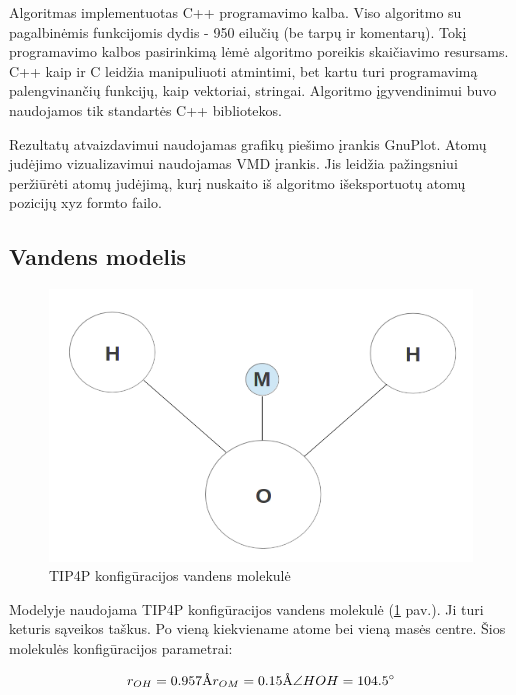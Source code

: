 Algoritmas implementuotas C++ programavimo kalba.
Viso algoritmo su pagalbinėmis funkcijomis dydis - 950 eilučių (be tarpų ir komentarų).
Tokį programavimo kalbos pasirinkimą lėmė algoritmo poreikis skaičiavimo resursams.
C++ kaip ir C leidžia manipuliuoti atmintimi, bet kartu turi programavimą palengvinančių funkcijų, kaip vektoriai, stringai.
Algoritmo įgyvendinimui buvo naudojamos tik standartės C++ bibliotekos.

Rezultatų atvaizdavimui naudojamas grafikų piešimo įrankis GnuPlot.
Atomų judėjimo vizualizavimui naudojamas VMD įrankis.
Jis leidžia pažingsniui peržiūrėti atomų judėjimą, kurį nuskaito iš algoritmo išeksportuotų atomų pozicijų xyz formto failo.


\subsection{Vandens modelis}
\label{sec:water}

\begin{figure}
    \centering
    \includegraphics[scale=0.65]{images/water.png}
    \caption{TIP4P konfigūracijos vandens molekulė}
    \label{fig:water}
\end{figure}

Modelyje naudojama TIP4P konfigūracijos vandens molekulė (\ref{fig:water} pav.).
Ji turi keturis sąveikos taškus.
Po vieną kiekviename atome bei vieną masės centre.
Šios molekulės konfigūracijos parametrai:

\begin{equation} \label{eq:water_conf}
r_{OH} = 0.957 \si{\angstrom} \\
r_{OM} = 0.15 \si{\angstrom} \\
\angle HOH = 104.5 \si{\degree}
\end{equation}


